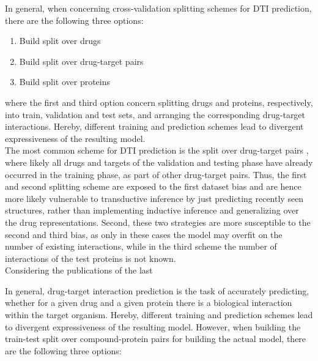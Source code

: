 \documentclass{bioinfo}
\begin{document}
In general, when concerning cross-validation splitting schemes for DTI prediction, there are the following three options:
\begin{enumerate}
	\item Build split over drugs
	\item Build split over drug-target pairs
	\item Build split over proteins
\end{enumerate}
where the first and third option concern splitting drugs and proteins, respectively, into train, validation and test sets, and arranging the corresponding drug-target interactions. Hereby, different training and prediction schemes lead to divergent expressiveness of the resulting model. \\
The most common scheme for DTI prediction is the split over drug-target pairs \citep{Survey2018}, where likely all drugs and targets of the validation and testing phase have already occurred in the training phase, as part of other drug-target pairs. Thus, the first and second splitting scheme are exposed to the first dataset bias and are hence more likely vulnerable to transductive inference by just predicting recently seen structures, rather than implementing inductive inference and generalizing over the drug representations. Second, these two strategies are more susceptible to the second and third bias, as only in these cases the model may overfit on the number of existing interactions, while in the third scheme the number of interactions of the test proteins is not known. \\






Considering the publications of the last 


In general, drug-target interaction prediction is the task of accurately predicting, whether for a given drug and a given protein there is a biological interaction within the target organism. Hereby, different training and prediction schemes lead to divergent expressiveness of the resulting model. However, when building the train-test split over compound-protein pairs for building the actual model, there are the following three options:
\end{document}
